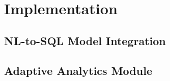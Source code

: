 \documentclass[conference]{IEEEtran}
\begin{document}
\section{Implementation}
\label{sec:impl}

\subsection{NL-to-SQL Model Integration}
\label{sec:impl:model}




\subsection{Adaptive Analytics Module}
\label{sec:impl:analytics}
\end{document}
